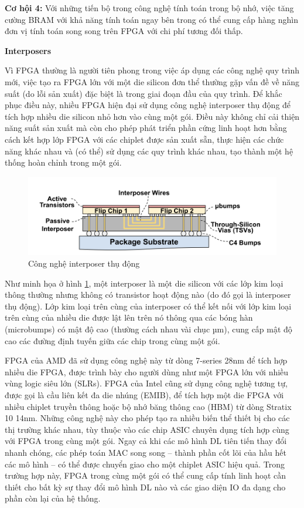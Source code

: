 \documentclass[a4paper]{article}
\begin{document}
\textbf{Cơ hội 4:} Với những tiến bộ trong công nghệ tính toán trong bộ nhớ, việc tăng cường BRAM với khả năng tính toán ngay bên trong có thể cung cấp hàng nghìn đơn vị tính toán song song trên FPGA với chi phí tương đối thấp.

\textbf{Interposers}

Vì FPGA thường là người tiên phong trong việc áp dụng các công nghệ quy trình mới, việc tạo ra FPGA lớn với một die silicon đơn thể thường gặp vấn đề về năng suất (do lỗi sản xuất) đặc biệt là trong giai đoạn đầu của quy trình. Để khắc phục điều này, nhiều FPGA hiện đại sử dụng công nghệ interposer thụ động để tích hợp nhiều die silicon nhỏ hơn vào cùng một gói. Điều này không chỉ cải thiện năng suất sản xuất mà còn cho phép phát triển phần cứng linh hoạt hơn bằng cách kết hợp lớp FPGA với các chiplet được sản xuất sẵn, thực hiện các chức năng khác nhau và (có thể) sử dụng các quy trình khác nhau, tạo thành một hệ thống hoàn chỉnh trong một gói.

\begin{figure} [!h]
    \centering
    \includegraphics[width=0.75\linewidth]{assets/fpga_8.png}
    \caption{Công nghệ interposer thụ động}
    \label{fig:fpga_8}
\end{figure}

Như minh họa ở hình \ref{fig:fpga_8}, một interposer là một die silicon với các lớp kim loại thông thường nhưng không có transistor hoạt động nào (do đó gọi là interposer thụ động). Lớp kim loại trên cùng của interposer có thể kết nối với lớp kim loại trên cùng của nhiều die được lật lên trên nó thông qua các bóng hàn (microbumps) có mật độ cao (thường cách nhau vài chục µm), cung cấp mật độ cao các đường định tuyến giữa các chip trong cùng một gói.

FPGA của AMD đã sử dụng công nghệ này từ dòng 7-series 28nm để tích hợp nhiều die FPGA, được trình bày cho người dùng như một FPGA lớn với nhiều vùng logic siêu lớn (SLRs). FPGA của Intel cũng sử dụng công nghệ tương tự, được gọi là cầu liên kết đa die nhúng (EMIB), để tích hợp một die FPGA với nhiều chiplet truyền thông hoặc bộ nhớ băng thông cao (HBM) từ dòng Stratix 10 14nm. Những công nghệ này cho phép tạo ra nhiều biến thể thiết bị cho các thị trường khác nhau, tùy thuộc vào các chip ASIC chuyên dụng tích hợp cùng với FPGA trong cùng một gói. Ngay cả khi các mô hình DL tiên tiến thay đổi nhanh chóng, các phép toán MAC song song – thành phần cốt lõi của hầu hết các mô hình – có thể được chuyển giao cho một chiplet ASIC hiệu quả. Trong trường hợp này, FPGA trong cùng một gói có thể cung cấp tính linh hoạt cần thiết cho bất kỳ sự thay đổi mô hình DL nào và các giao diện IO đa dạng cho phần còn lại của hệ thống.
\end{document}
